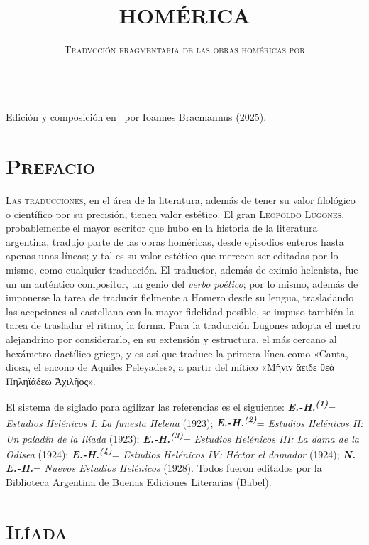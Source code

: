 \documentclass[11pt,twoside]{article}
\title{\fontsize{40}{20}\selectfont\textbf{HOMÉRICA}}
\date{\vspace{40pt} \textsc{Tradvcción fragmentaria de las obras homéricas por}\\\vspace*{14pt}{\huge\textsc{\textbf{Leopoldo Lvgones}}}\\\fontsize{40}{11}\selectfont{\vfill\textbf{\LaTeX}}}
\newcommand{\ehuno}{\emph{\textbf{E.-H.\textsuperscript{(1)}}}}
\newcommand{\ehdos}{\emph{\textbf{E.-H.\textsuperscript{(2)}}}}
\newcommand{\ehter}{\emph{\textbf{E.-H.\textsuperscript{(3)}}}}
\newcommand{\ehctr}{\emph{\textbf{E.-H.\textsuperscript{(4)}}}}
\newcommand{\neh}{\emph{\textbf{N. E.-H.}}}
\begin{document}
	\maketitle
\newpage
%
\null
\vfill
\begin{flushright}
	Edición y composición en \XeLaTeX\ por Ioannes Bracmannus (2025).
\end{flushright}
\newpage
%
\tableofcontents
\newpage
%
\setcounter{page}{1}
\section*{\centering\textsc{Prefacio}}
\par
%
\noindent\textsc{Las traducciones}, en el área de la literatura, además de tener su valor filológico o científico por su precisión, tienen valor estético. El gran \textsc{Leopoldo Lugones}, probablemente el mayor escritor que hubo en la historia de la literatura argentina, tradujo parte de las obras homéricas, desde episodios enteros hasta apenas unas líneas; y tal es su valor estético que merecen ser editadas por lo mismo, como cualquier traducción. El traductor, además de eximio helenista, fue un un auténtico compositor, un genio del \emph{verbo poético}; por lo mismo, además de imponerse la tarea de traducir fielmente a Homero desde su lengua, trasladando las acepciones al castellano con la mayor fidelidad posible, se impuso también la tarea de trasladar el ritmo, la forma. Para la traducción Lugones adopta el metro alejandrino por considerarlo, en su extensión y estructura, el más cercano al hexámetro dactílico griego, y es así que traduce la primera línea como «Canta, diosa, el encono de Aquiles Peleyades», a partir del mítico «Μῆνιν ἄειδε θεὰ Πηληϊάδεω Ἀχιλῆος».\par
%
El sistema de siglado para agilizar las referencias es el siguiente: \ehuno = \emph{Estudios Helénicos I: La funesta Helena} (1923); \ehdos = \emph{Estudios Helénicos II: Un paladín de la Ilíada} (1923); \ehter = \emph{Estudios Helénicos III: La dama de la Odisea} (1924); \ehctr = \emph{Estudios Helénicos IV: Héctor el domador} (1924); \neh = \emph{Nuevos Estudios Helénicos} (1928). Todos fueron editados por la Biblioteca Argentina de Buenas Ediciones Literarias (Babel).\par
\newpage
%
\section*{\raggedleft\fontsize{30}{14}\textsc{Ilíada}}
\repage
%
\setcounter{page}{3}

\repage
%

\repage
%

\repage

\repage
%

\repage
%

\repage
%
%
\end{document}

